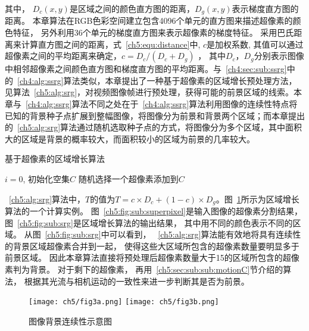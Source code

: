 其中， $D_c(x,y)$是区域之间的颜色直方图的距离，$D_g(x,y)$表示梯度直方图的距离。 本章算法在RGB色彩空间建立包含4096个单元的直方图来描述超像素的颜色特征， 另外利用36个单元的梯度直方图来表示超像素的梯度特征。 采用巴氏距离来计算直方图之间的距离，式~\ref{ch5:equ:distance}中, $c$是加权系数, 其值可以通过超像素之间的平均距离来确定，$c = D_c / (D_c + D_g)$  ， 其中$D_c$，$D_g$分别表示图像中相邻超像素之间颜色直方图和梯度直方图的平均距离。与~\ref{ch4:sec:sub:ssrg}中的~\ref{ch4:alg:ssrg}算法类似，本章提出了一种基于超像素的区域增长预处理方法，见算法~\ref{ch5:alg:srg}，对视频图像帧进行预处理，获得可能的前景区域的线索。本章与~\ref{ch4:alg:ssrg}算法不同之处在于~\ref{ch4:alg:ssrg}算法利用图像的连续性特点将已知的背景种子点扩展到整幅图像，将图像分为前景和背景两个区域；而本章提出的~\ref{ch5:alg:srg}算法通过随机选取种子点的方式，将图像分为多个区域，其中面积大的区域是背景的概率较大，而面积较小的区域为前景的几率较大。
\renewcommand{\algorithmcfname}{算法}
\begin{algorithm}
\caption{基于超像素的区域增长算法}
\label{ch5:alg:srg}
\LinesNumbered
{}
  $i=0$, 初始化空集$C$ \;
 随机选择一个超像素添加到$C$ \;
\end{algorithm}

~\ref{ch5:alg:srg}算法中，$T$的值为$T= c \times D_c + (1-c) \times D_g$。图~\ref{ch5:fig:srg}所示为区域增长算法的一个计算实例。 图~\ref{ch5:fig:sub:superpixel}是输入图像的超像素分割结果， 图~\ref{ch5:fig:sub:srg}是区域增长算法的输出结果， 其中用不同的颜色表示不同的区域。 从图~\ref{ch5:fig:sub:srg}中可以看到， ~\ref{ch5:alg:srg}算法能有效地将具有连续性的背景区域超像素合并到一起， 使得这些大区域所包含的超像素数量要明显多于前景区域。 因此本章算法直接将预处理后超像素数量大于15的区域所包含的超像素判为背景。 对于剩下的超像素， 再用~\ref{ch5:sec:sub:sub:motionC}节介绍的算法， 根据其光流与相机运动的一致性来进一步判断其是否为前景。
 \begin{figure}[htb]
  \centering%
    {\texttt{[image: ch5/fig3a.png]}}%
 \hspace{1em}%
      {\texttt{[image: ch5/fig3b.png]}}

  \caption{图像背景连续性示意图}\label{ch5:fig:srg}
\end{figure}

